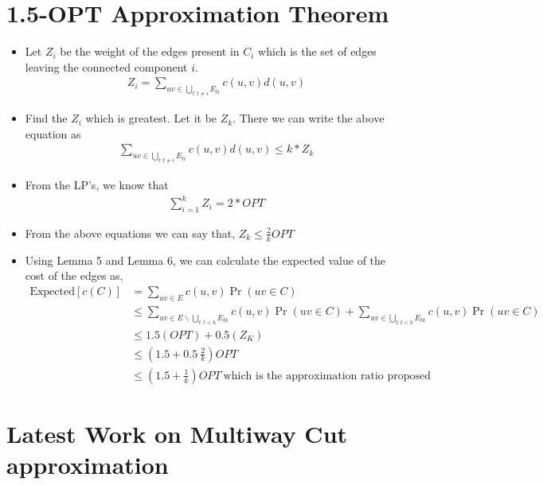 \documentclass[11pt]{article}
\begin{document}
\section{1.5-OPT Approximation Theorem} 
\begin{itemize} \itemsep -3pt
    \item Let $Z_i$ be the weight of the edges present in $C_i$ which is the set of edges leaving the connected component $i$. 
        \begin{align*}
            Z_i = \sum\limits_{uv \in \bigcup\limits_{t:t \ne i}{E_{ti}}}{c(u,v)d(u,v)}
        \end{align*}
    \item Find the $Z_i$ which is greatest. Let it be $Z_k$. There we can write the above equation as 
        \begin{align*}
            \sum\limits_{uv \in \bigcup\limits_{t:t \ne i}{E_{ti}}}{c(u,v)d(u,v)} \le k * Z_k
        \end{align*}
    \item From the LP's, we know that
        \begin{align*}
            \sum\limits_{i = 1}^{k}{Z_i} = 2 * OPT
        \end{align*}
    \item From the above equations we can say that, $Z_k \le \frac{2}{k} OPT$ 
    \item Using Lemma 5 and Lemma 6, we can calculate the expected value of the cost of the edges as,
        \begin{align*}
            \text{Expected}[c(C)] &= \sum\limits_{uv \in E}{c(u,v) \Pr(uv \in C)}\\
            &\le \sum\limits_{uv \in E \backslash \bigcup\limits_{t:t<k}{E_{tk}}}{c(u,v) \Pr(uv \in C)} + \sum\limits_{uv \in \bigcup\limits_{t:t<k}{E_{tk}}}{c(u,v) \Pr(uv \in C)} \\
            &\le 1.5 (OPT) + 0.5(Z_K)\\
            &\le (1.5 + 0.5 \ \frac{2}{k})OPT\\
            &\le (1.5 + \frac{1}{k})OPT \ \text{which is the approximation ratio proposed}
        \end{align*}
\end{itemize}


\section{Latest Work on Multiway Cut approximation}
\end{document}
